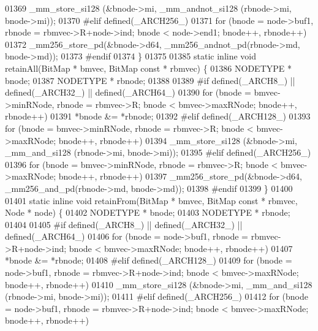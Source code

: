 \begin{DoxyCode}
{01369                 \_mm\_store\_si128 (&bnode->mi, \_mm\_andnot\_si128 (rbnode->mi, bnode->mi));
01370 \textcolor{preprocessor}{#elif defined(\_ARCH256\_)}
01371         \textcolor{keywordflow}{for} (bnode = node->buf1, rbnode = rbmvec->R+node->ind; bnode < node->end1; bnode++, rbnode++)
01372                 \_mm256\_store\_pd(&bnode->d64, \_mm256\_andnot\_pd(rbnode->md, bnode->md));
01373 \textcolor{preprocessor}{#endif}
01374 \}
01375 
01385 \textcolor{keyword}{static} \textcolor{keyword}{inline} \textcolor{keywordtype}{void} retainAll(BitMap * bmvec, BitMap \textcolor{keyword}{const} * rbmvec) \{
01386         NODETYPE * bnode;
01387         NODETYPE * rbnode;
01388 
01389 \textcolor{preprocessor}{#if defined(\_ARCH8\_) || defined(\_ARCH32\_) || defined(\_ARCH64\_)}
01390         \textcolor{keywordflow}{for} (bnode = bmvec->minRNode, rbnode = rbmvec->R; bnode < bmvec->maxRNode; bnode++, rbnode++)
01391                 *bnode &= *rbnode;
01392 \textcolor{preprocessor}{#elif defined(\_ARCH128\_)}
01393         \textcolor{keywordflow}{for} (bnode = bmvec->minRNode, rbnode = rbmvec->R; bnode < bmvec->maxRNode; bnode++, rbnode++)
01394                 \_mm\_store\_si128 (&bnode->mi, \_mm\_and\_si128 (rbnode->mi, bnode->mi));
01395 \textcolor{preprocessor}{#elif defined(\_ARCH256\_)}
01396         \textcolor{keywordflow}{for} (bnode = bmvec->minRNode, rbnode = rbmvec->R; bnode < bmvec->maxRNode; bnode++, rbnode++)
01397                 \_mm256\_store\_pd(&bnode->d64, \_mm256\_and\_pd(rbnode->md, bnode->md));
01398 \textcolor{preprocessor}{#endif}
01399 \}
01400 
01401 \textcolor{keyword}{static} \textcolor{keyword}{inline} \textcolor{keywordtype}{void} retainFrom(BitMap * bmvec, BitMap \textcolor{keyword}{const} * rbmvec, Node * node) \{
01402         NODETYPE * bnode;
01403         NODETYPE * rbnode;
01404 
01405 \textcolor{preprocessor}{#if defined(\_ARCH8\_) || defined(\_ARCH32\_) || defined(\_ARCH64\_)}
01406         \textcolor{keywordflow}{for} (bnode = node->buf1, rbnode = rbmvec->R+node->ind; bnode < bmvec->maxRNode; bnode++, rbnode++)
01407                 *bnode &= *rbnode;
01408 \textcolor{preprocessor}{#elif defined(\_ARCH128\_)}
01409         \textcolor{keywordflow}{for} (bnode = node->buf1, rbnode = rbmvec->R+node->ind; bnode < bmvec->maxRNode; bnode++, rbnode++)
01410                 \_mm\_store\_si128 (&bnode->mi, \_mm\_and\_si128 (rbnode->mi, bnode->mi));
01411 \textcolor{preprocessor}{#elif defined(\_ARCH256\_)}
01412         \textcolor{keywordflow}{for} (bnode = node->buf1, rbnode = rbmvec->R+node->ind; bnode < bmvec->maxRNode; bnode++, rbnode++)
}
\end{DoxyCode}
